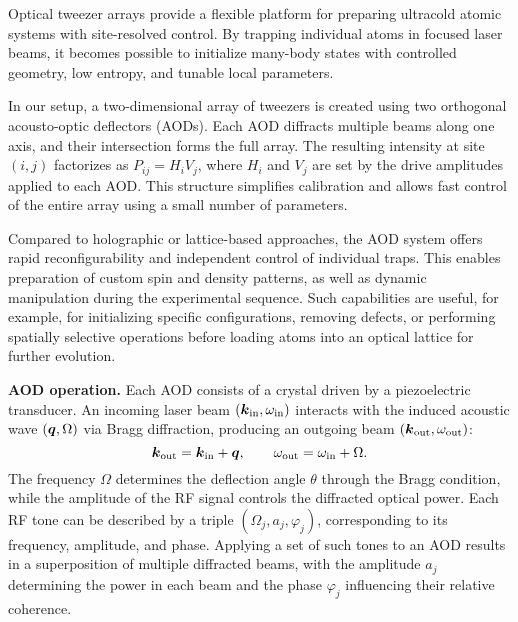 

Optical tweezer arrays provide a flexible platform for preparing ultracold atomic systems with site-resolved control. By trapping individual atoms in focused laser beams, it becomes possible to initialize many-body states with controlled geometry, low entropy, and tunable local parameters.

In our setup, a two-dimensional array of tweezers is created using two orthogonal acousto-optic deflectors (AODs). Each AOD diffracts multiple beams along one axis, and their intersection forms the full array. The resulting intensity at site $(i,j)$ factorizes as $P_{ij} = H_i V_j$, where $H_i$ and $V_j$ are set by the drive amplitudes applied to each AOD. This structure simplifies calibration and allows fast control of the entire array using a small number of parameters.

Compared to holographic or lattice-based approaches, the AOD system offers rapid reconfigurability and independent control of individual traps. This enables preparation of custom spin and density patterns, as well as dynamic manipulation during the experimental sequence. Such capabilities are useful, for example, for initializing specific configurations, removing defects, or performing spatially selective operations before loading atoms into an optical lattice for further evolution.

\textbf{AOD operation.} Each AOD consists of a crystal driven by a piezoelectric transducer. An incoming laser beam $(\boldsymbol{k}_{\mathrm{in}}, \omega_{\mathrm{in}})$ interacts with the induced acoustic wave $(\boldsymbol{q}, \Omega)$ via Bragg diffraction, producing an outgoing beam $(\boldsymbol{k}_{\mathrm{out}}, \omega_{\mathrm{out}})$:
\begin{equation*}
    \boldsymbol{k}_{\mathrm{out}} = \boldsymbol{k}_{\mathrm{in}} + \boldsymbol{q}, \qquad \omega_{\mathrm{out}} = \omega_{\mathrm{in}} + \Omega.
\end{equation*}
The frequency $\Omega$ determines the deflection angle $\theta$ through the Bragg condition, while the amplitude of the RF signal controls the diffracted optical power. Each RF tone can be described by a triple $(\Omega_j, a_j, \varphi_j)$, corresponding to its frequency, amplitude, and phase. Applying a set of such tones to an AOD results in a superposition of multiple diffracted beams, with the amplitude $a_j$ determining the power in each beam and the phase $\varphi_j$ influencing their relative coherence.


